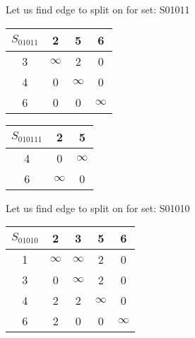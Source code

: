 \documentclass[a4paper,10pt]{report} %
\begin{document}
\newpage

Let us find edge to split on for set: S01011\\
\begin{flushleft}\begin{tabular}[]{|c|c|c|c|}
\hline
$S_{01011 }$& 2 & 5 & 6\\
\hline
3 & $\infty$ &      2 &      0\\
\hline
4 &      0 & $\infty$ &      0\\
\hline
6 &      0 &      0 & $\infty$\\
\hline
\end{tabular}
\end{flushleft}


\begin{table}[ht]
\hfill
{}
\end{table}


\begin{tabular}[]{|c|c|c|}
\hline
$S_{010111 }$& 2 & 5\\
\hline
4 &      0 & $\infty$\\
\hline
6 & $\infty$ &      0\\
\hline
\end{tabular}
\newpage

Let us find edge to split on for set: S01010\\
\begin{flushleft}\begin{tabular}[]{|c|c|c|c|c|}
\hline
$S_{01010 }$& 2 & 3 & 5 & 6\\
\hline
1 & $\infty$ & $\infty$ &      2 &      0\\
\hline
3 &      0 & $\infty$ &      2 &      0\\
\hline
4 &      2 &      2 & $\infty$ &      0\\
\hline
6 &      2 &      0 &      0 & $\infty$\\
\hline
\end{tabular}
\end{flushleft}
\end{document}
